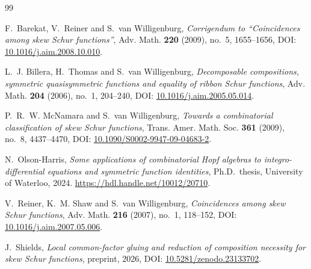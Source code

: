 \documentclass[11pt,a4paper]{amsart}
\numberwithin{equation}{section}
\theoremstyle{plain}
\theoremstyle{definition}
\begin{document}
\begin{thebibliography}{99}

F.~Barekat, V.~Reiner and S.~van Willigenburg,
\emph{Corrigendum to ``Coincidences among skew Schur functions''},
Adv. Math. \textbf{220} (2009), no.~5, 1655--1656,
DOI: \href{https://doi.org/10.1016/j.aim.2008.10.010}{10.1016/\allowbreak j.aim.2008.10.010}.

L.~J. Billera, H.~Thomas and S.~van Willigenburg,
\emph{Decomposable compositions, symmetric quasisymmetric functions and equality of ribbon Schur functions},
Adv. Math. \textbf{204} (2006), no.~1, 204--240,
DOI: \href{https://doi.org/10.1016/j.aim.2005.05.014}{10.1016/\allowbreak j.aim.2005.05.014}.

P.~R.~W. McNamara and S.~van Willigenburg,
\emph{Towards a combinatorial classification of skew Schur functions},
Trans. Amer. Math. Soc. \textbf{361} (2009), no.~8, 4437--4470,
DOI: \href{https://doi.org/10.1090/S0002-9947-09-04683-2}{10.1090/\allowbreak S0002-9947-09-04683-2}.

N.~Olson-Harris,
\emph{Some applications of combinatorial Hopf algebras to integro-differential equations and symmetric function identities},
Ph.D.\ thesis, University of Waterloo, 2024.
\url{https://hdl.handle.net/10012/20710}.

V.~Reiner, K.~M. Shaw and S.~van Willigenburg,
\emph{Coincidences among skew Schur functions},
Adv. Math. \textbf{216} (2007), no.~1, 118--152,
DOI: \href{https://doi.org/10.1016/j.aim.2007.05.006}{10.1016/\allowbreak j.aim.2007.05.006}.

J.~Shields,
\emph{Local common-factor gluing and reduction of composition necessity for skew Schur functions},
preprint, 2026,
DOI: \href{https://doi.org/10.5281/zenodo.23133702}{10.5281/\allowbreak zenodo.23133702}.
\end{thebibliography}
\end{document}
